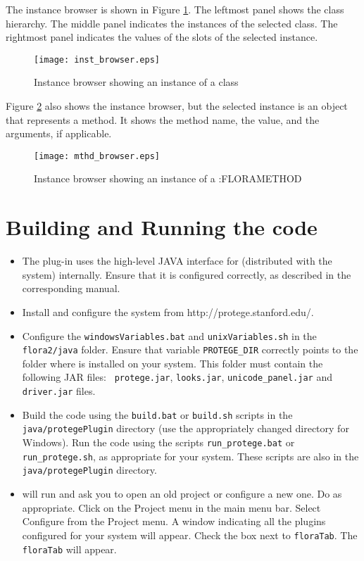 The instance browser is shown in Figure \ref{fig:flora-inst1}. The
leftmost panel shows the class hierarchy. The middle panel indicates
the instances of the selected class. The rightmost panel indicates
the values of the slots of the selected instance.

\begin{figure}
\begin{center}
\texttt{[image: inst\_browser.eps]}
\caption{Instance browser showing an instance of a \FLORA class}
\label{fig:flora-inst1}
\end{center}
\end{figure}

Figure \ref{fig:flora-inst2} also shows the instance browser, but
the selected instance is an object that represents a \FLORA method.
It shows the method name, the value, and the arguments, if
applicable.
\begin{figure}
\begin{center}
\texttt{[image: mthd\_browser.eps]}
\caption{Instance browser showing an instance of a :FLORAMETHOD}
\label{fig:flora-inst2}
\end{center}
\end{figure}

\section{Building and Running the code}
\begin{itemize}
\item The \Protege plug-in uses the high-level JAVA interface for
\FLORA (distributed with the \FLORA system) internally. Ensure that
it is configured correctly, as described in the corresponding manual.
\item Install and configure the \Protege system from
  http://protege.stanford.edu/.
\item Configure the {\tt windowsVariables.bat} and {\tt unixVariables.sh}
  in the {\tt flora2/java} folder. Ensure that variable {\tt PROTEGE\_DIR}
  correctly points to the folder where \Protege is installed on your
  system. This folder must contain the following JAR files: {\tt
  protege.jar}, {\tt looks.jar}, 
  {\tt unicode\_panel.jar}  and {\tt driver.jar}  files.
\item Build the code using the {\tt build.bat} or  {\tt build.sh}  scripts in
the {\tt java/protegePlugin}
directory (use the appropriately changed directory for Windows). Run the
code using the scripts {\tt run\_protege.bat} or  {\tt run\_protege.sh}, as
appropriate for your system. 
These scripts are also in the {\tt java/protegePlugin} directory.
\item \Protege will run and ask you to open an old project or
configure a new one. Do as appropriate. Click on the Project menu in the
main menu bar. Select
Configure from the Project menu. A window indicating all
the plugins configured for your system will appear. Check the
box next to {\tt floraTab}. The {\tt floraTab}  will appear.
\end{itemize}

